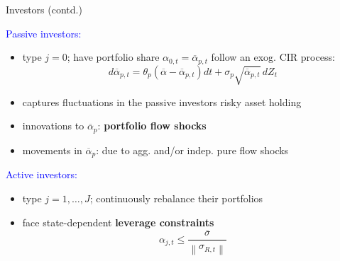 \documentclass[12pt,aspectratio=169]{beamer}
\newenvironment{wideitemize}{\itemize\addtolength{\itemsep}{10pt}}{\enditemize}
\newcommand{\vspM}{\vspace{0.12truecm}}
\begin{document}
\begin{frame}{Investors (contd.)}
\begin{wideitemize}
    \item \textcolor{blue}{Passive investors:}
    \begin{itemize}
        \item  type $j=0$; have portfolio share $\alpha_{0,t}=\overline{\alpha}_{p,t}$ follow an exog. CIR process:
        \[d \overline{\alpha}_{p, t}=\theta_{p}\left(\overline{\alpha}-\overline{\alpha}_{p, t}\right) d t+\sigma_{p} \sqrt{\overline{\alpha}_{p, t}}\, d Z_{t}\]
        \item captures fluctuations in the passive investors risky asset holding\vspM
        \item innovations to $\overline{\alpha}_p$: \textbf{portfolio flow shocks}\vspM
        \item movements in $\overline{\alpha}_p$: due to agg. and/or indep. pure flow shocks\vspM
    \end{itemize}
    \item \textcolor{blue}{Active investors:} 
    \begin{itemize}
        \item type $j=1,\ldots,J$; continuously rebalance their portfolios\vspM
        \item face state-dependent \textbf{leverage constraints}
        \[\alpha_{j, t} \leq \frac{\overline{\sigma}}{\left\|\sigma_{R, t}\right\|}\]
    \end{itemize}
\end{wideitemize}
\end{frame}
\end{document}
